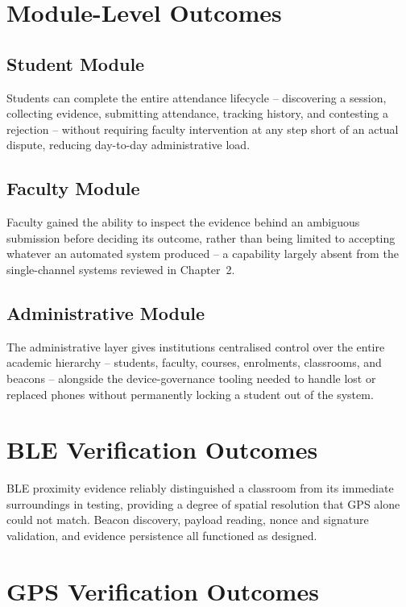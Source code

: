 \documentclass[12pt, a4paper, oneside]{report}
\begin{document}
\section{Module-Level Outcomes}

\subsection{Student Module}
Students can complete the entire attendance lifecycle -- discovering a session, collecting evidence, submitting attendance, tracking history, and contesting a rejection -- without requiring faculty intervention at any step short of an actual dispute, reducing day-to-day administrative load.

\subsection{Faculty Module}
Faculty gained the ability to inspect the evidence behind an ambiguous submission before deciding its outcome, rather than being limited to accepting whatever an automated system produced -- a capability largely absent from the single-channel systems reviewed in Chapter~2.

\subsection{Administrative Module}
The administrative layer gives institutions centralised control over the entire academic hierarchy -- students, faculty, courses, enrolments, classrooms, and beacons -- alongside the device-governance tooling needed to handle lost or replaced phones without permanently locking a student out of the system.

\section{BLE Verification Outcomes}

BLE proximity evidence reliably distinguished a classroom from its immediate surroundings in testing, providing a degree of spatial resolution that GPS alone could not match. Beacon discovery, payload reading, nonce and signature validation, and evidence persistence all functioned as designed.

\section{GPS Verification Outcomes}
\end{document}
